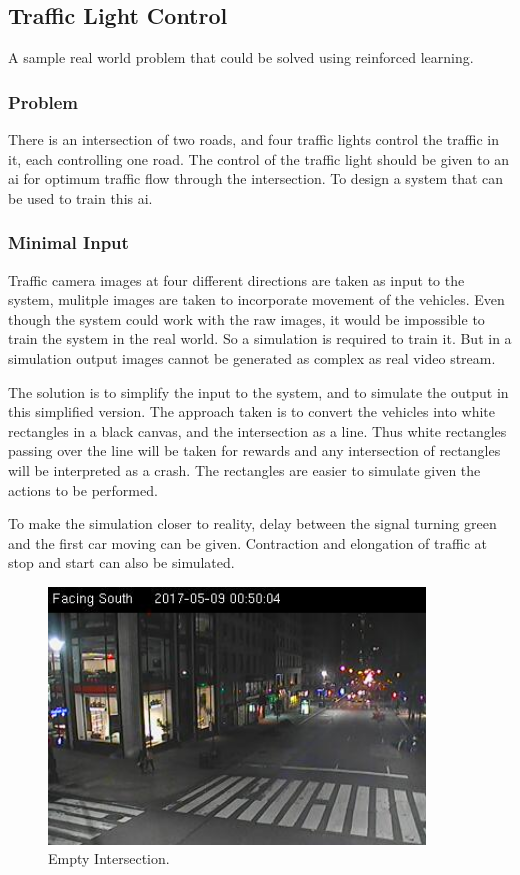\documentclass[a4paper,11pt]{article}
\begin{document}
		\subsection{Traffic Light Control}
				A sample real world problem that could be solved using reinforced learning.
			\subsubsection{Problem}
				There is an intersection of two roads, and four traffic lights control the traffic in it, each controlling one road. The control of the traffic light should be given to an \ac{ai} for optimum traffic flow through the intersection. To design a system that can be used to train this \ac{ai}. 

			\subsubsection{Minimal Input}
				Traffic camera images at four different directions are taken as input to the system, mulitple images are taken to incorporate movement of the vehicles. Even though the system could work with the raw images, it would be impossible to train the system in the real world. So a simulation is required to train it. But in a simulation output images cannot be generated as complex as real video stream. 

				The solution is to simplify the input to the system, and to simulate the output in this simplified version. The approach taken is to convert the vehicles into white rectangles in a black canvas, and the intersection as a line. Thus white rectangles passing over the line will be taken for rewards and any intersection of rectangles will be interpreted as a crash. The rectangles are easier to simulate given the actions to be performed.

				To make the simulation closer to reality, delay between the signal turning green and the first car moving can be given. Contraction and elongation of traffic at stop and start can also be simulated.

				\begin{figure}[!h]
					\begin{centering}
						\includegraphics[width=10cm]{images/traffic1.png}
						\caption{Empty Intersection.}
					\end{centering}
				\end{figure}
\end{document}
